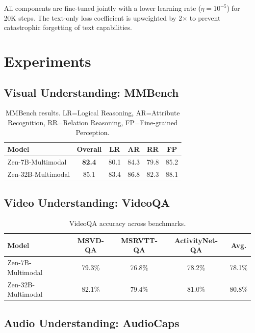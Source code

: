 \documentclass[11pt,a4paper]{article}
\begin{document}
All components are fine-tuned jointly with a lower learning rate ($\eta=10^{-5}$)
for 20K steps. The text-only loss coefficient is upweighted by 2$\times$ to
prevent catastrophic forgetting of text capabilities.

\section{Experiments}

\subsection{Visual Understanding: MMBench}

\begin{table}[H]
\centering
\begin{tabular}{lccccc}
\toprule
\textbf{Model} & \textbf{Overall} & \textbf{LR} & \textbf{AR} & \textbf{RR} & \textbf{FP} \\
\midrule
Zen-7B-Multimodal & \textbf{82.4} & 80.1 & 84.3 & 79.8 & 85.2 \\
Zen-32B-Multimodal & 85.1 & 83.4 & 86.8 & 82.3 & 88.1 \\
\bottomrule
\end{tabular}
\caption{MMBench results. LR=Logical Reasoning, AR=Attribute Recognition, RR=Relation Reasoning, FP=Fine-grained Perception.}
\end{table}

\subsection{Video Understanding: VideoQA}

\begin{table}[H]
\centering
\begin{tabular}{lcccc}
\toprule
\textbf{Model} & \textbf{MSVD-QA} & \textbf{MSRVTT-QA} & \textbf{ActivityNet-QA} & \textbf{Avg.} \\
\midrule
Zen-7B-Multimodal & 79.3\% & 76.8\% & 78.2\% & 78.1\% \\
Zen-32B-Multimodal & 82.1\% & 79.4\% & 81.0\% & 80.8\% \\
\bottomrule
\end{tabular}
\caption{VideoQA accuracy across benchmarks.}
\end{table}

\subsection{Audio Understanding: AudioCaps}
\end{document}
